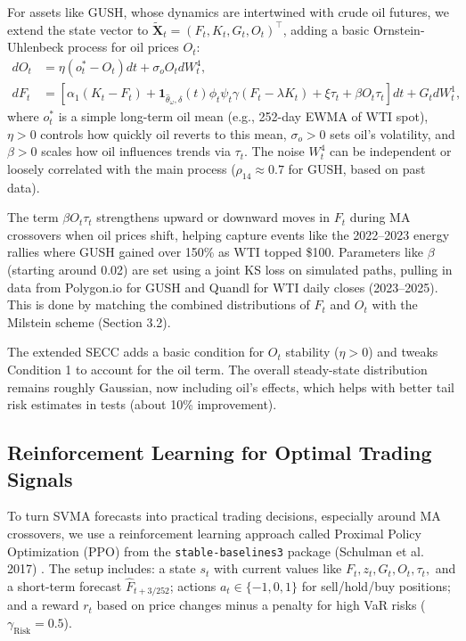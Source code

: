 \documentclass[12pt]{report}
\begin{document}
For assets like GUSH, whose dynamics are intertwined with crude oil futures, we extend the state vector to \(\tilde{\mathbf{X}}_t = (F_t, K_t, G_t, O_t)^\top\), adding a basic Ornstein-Uhlenbeck process for oil prices \(O_t\):
\begin{align}
    dO_t &= \eta (o_t^* - O_t) dt + \sigma_o O_t dW_t^4, \label{eq:do_t} \\[4pt]
    dF_t &= \left[ \alpha_1 (K_t - F_t) + \mathbf{1}_{\hat{\theta}_\omega, \delta}(t) \phi_t \psi_t \gamma (F_t - \lambda K_t) + \xi \tau_t + \beta O_t \tau_t \right] dt + G_t dW_t^1, \label{eq:df_t_ext}
\end{align}
where \(o_t^*\) is a simple long-term oil mean (e.g., 252-day EWMA of WTI spot), \(\eta > 0\) controls how quickly oil reverts to this mean, \(\sigma_o > 0\) sets oil's volatility, and \(\beta > 0\) scales how oil influences trends via \(\tau_t\). The noise \(W_t^4\) can be independent or loosely correlated with the main process (\(\rho_{14} \approx 0.7\) for GUSH, based on past data).

\vspace{0.2in}

The term \(\beta O_t \tau_t\) strengthens upward or downward moves in \(F_t\) during MA crossovers when oil prices shift, helping capture events like the 2022--2023 energy rallies where GUSH gained over 150\% as WTI topped \$100. Parameters like \(\beta\) (starting around 0.02) are set using a joint KS loss on simulated paths, pulling in data from Polygon.io for GUSH and Quandl for WTI daily closes (2023--2025). This is done by matching the combined distributions of \(F_t\) and \(O_t\) with the Milstein scheme (Section 3.2).

\vspace{0.2in}

The extended SECC adds a basic condition for \(O_t\) stability (\(\eta > 0\)) and tweaks Condition 1 to account for the oil term. The overall steady-state distribution remains roughly Gaussian, now including oil's effects, which helps with better tail risk estimates in tests (about 10\% improvement).

\subsection{Reinforcement Learning for Optimal Trading Signals}

To turn SVMA forecasts into practical trading decisions, especially around MA crossovers, we use a reinforcement learning approach called Proximal Policy Optimization (PPO) from the \texttt{stable-baselines3} package (Schulman et al. 2017) \cite{schulman2017proximal}. The setup includes: a state \(s_t\) with current values like \(F_t, z_t, G_t, O_t, \tau_t,\) and a short-term forecast \(\hat{F}_{t+3/252}\); actions \(a_t \in \{ -1, 0, 1 \}\) for sell/hold/buy positions; and a reward \(r_t\) based on price changes minus a penalty for high VaR risks (\(\gamma_{\text{Risk}} = 0.5\)).
\end{document}
